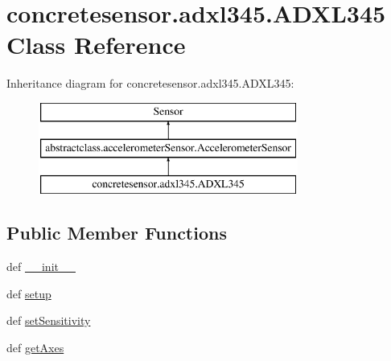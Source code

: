 \hypertarget{classconcretesensor_1_1adxl345_1_1ADXL345}{}\section{concretesensor.\+adxl345.\+A\+D\+X\+L345 Class Reference}
\label{classconcretesensor_1_1adxl345_1_1ADXL345}
Inheritance diagram for concretesensor.\+adxl345.\+A\+D\+X\+L345\+:\begin{figure}[H]
\begin{center}
\leavevmode
\includegraphics[height=3.000000cm]{classconcretesensor_1_1adxl345_1_1ADXL345}
\end{center}
\end{figure}
\subsection*{Public Member Functions}
\begin{DoxyCompactItemize}
\item 
def \hyperlink{classconcretesensor_1_1adxl345_1_1ADXL345_a4106f22a9a857f49602cd109141a953b}{\+\_\+\+\_\+init\+\_\+\+\_\+}
\item 
def \hyperlink{classconcretesensor_1_1adxl345_1_1ADXL345_afc278c6f2ae54592b29f1741b8542613}{setup}
\item 
def \hyperlink{classconcretesensor_1_1adxl345_1_1ADXL345_a5fe1a6eac657cc02017269bade2db7aa}{set\+Sensitivity}
\item 
def \hyperlink{classconcretesensor_1_1adxl345_1_1ADXL345_a878584534b3d4abebbee79c6ef4c85ad}{get\+Axes}
\end{DoxyCompactItemize}
